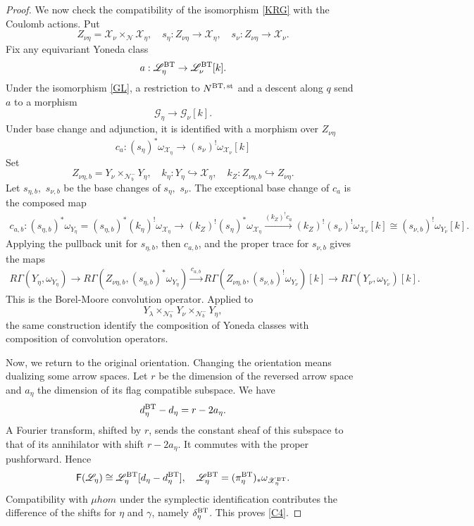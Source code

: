 \documentclass[11pt,reqno]{amsart}
\theoremstyle{definition}
\theoremstyle{remark}
\def\muhom{\mu hom}
\begin{document}
\begin{proof}
We now check the  compatibility of the isomorphism \eqref{KRG} with the Coulomb actions. Put
\[
 Z_{\nu\eta}=\mathcal X_\nu\times_{\mathcal N}\mathcal X_\eta,
 \quad s_\eta:Z_{\nu\eta}\to\mathcal X_\eta,
 \quad s_\nu:Z_{\nu\eta}\to\mathcal X_\nu.
\]
Fix any equivariant Yoneda class
$$a:\mathscr L_\eta^{\rm BT}\to\mathscr L_\nu^{\rm BT}[k].$$
Under the isomorphism \eqref{GL}, a restriction to $N^{\rm BT,\,st}$ and a
descent along $q$ send $a$ to a morphism
$$\mathcal G_\eta\to\mathcal G_\nu[k].$$
Under base change and adjunction, it is identified with a morphism over $Z_{\nu\eta}$
\[
 c_a:(s_\eta)^*\omega_{\mathcal X_\eta}
             \longrightarrow (s_\nu)^!\omega_{\mathcal X_\nu}[k]
\]
Set 
$$Z_{\nu\eta,b}=Y_\nu\times_{\mathcal N_b^-}Y_\eta
,\quad
k_\eta:Y_\eta\hookrightarrow\mathcal X_\eta
,\quad
k_Z:Z_{\nu\eta,b}\hookrightarrow Z_{\nu\eta}.$$
Let $s_{\eta,b},$ $s_{\nu,b}$ be the base changes of $s_\eta,$ $s_\nu$.
The exceptional base change of $c_a$ is the composed map
\[
\begin{aligned}
 c_{a,b}:(s_{\eta,b})^*\omega_{Y_\eta}
 =(s_{\eta,b})^*(k_\eta)^!\omega_{\mathcal X_\eta}
 \longrightarrow (k_Z)^!(s_\eta)^*\omega_{\mathcal X_\eta}
 \xrightarrow{(k_Z)^!c_a} (k_Z)^!(s_\nu)^!\omega_{\mathcal X_\nu}[k]
 \cong (s_{\nu,b})^!\omega_{Y_\nu}[k].
\end{aligned}
\]
Applying the pullback unit for $s_{\eta,b}$, then $c_{a,b}$, and the proper
trace for $s_{\nu,b}$ gives the maps
\[
\begin{aligned}
 R\Gamma(Y_\eta,\omega_{Y_\eta})
 \longrightarrow R\Gamma(Z_{\nu\eta,b},(s_{\eta,b})^*\omega_{Y_\eta})
 \xrightarrow{c_{a,b}} R\Gamma(Z_{\nu\eta,b},(s_{\nu,b})^!\omega_{Y_\nu})[k]
 \longrightarrow R\Gamma(Y_\nu,\omega_{Y_\nu})[k].
\end{aligned}
\]
This is the Borel-Moore convolution operator. 
Applied to
$$Y_\lambda\times_{\mathcal N_b^-}Y_\nu\times_{\mathcal N_b^-}Y_\eta,$$
the same construction identify the composition of Yoneda classes with composition of convolution operators.


Now, we return to the original orientation.
Changing the orientation means dualizing some arrow spaces.
Let $r$ be the dimension of the
reversed arrow space and $a_\eta$ the dimension of its
flag compatible subspace. We have 
$$d_\eta^{\rm BT}-d_\eta=r-2a_\eta.$$
A Fourier transform, shifted by $r$, sends the
constant sheaf of this subspace to that of its annihilator with shift $r-2a_\eta$. 
It commutes with the proper pushforward.
Hence
\[
 \mathsf F(\mathscr L_\eta)
 \cong\mathscr L_\eta^{\rm BT}[d_\eta-d_\eta^{\rm BT}],
 \quad
 \mathscr L_\eta^{\rm BT}=(\pi_\eta^{\rm BT})_*
                      \omega_{\mathscr X_\eta^{\rm BT}}.
\]
Compatibility with $\muhom$ under the symplectic identification
\cite[\S3.7, Ex.~VII.2]{KS90} contributes the difference of the
shifts for $\eta$ and $\gamma$, namely $\delta_\eta^{\rm BT}$.
This proves \eqref{C4}.


\end{proof}
\end{document}
